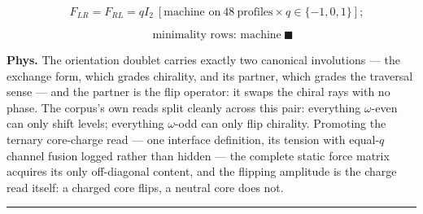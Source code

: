 \begin{theorem}
\[
\quad F_{LR}=F_{RL}=qI_2\ [\text{machine on}\ 48\ \text{profiles}\times q\in\{-1,0,1\}];
\]

\[
\qquad \text{minimality rows: machine}\ \blacksquare
\]

\textbf{Phys.} The orientation doublet carries exactly two canonical involutions — the exchange form, which grades chirality, and its partner, which grades the traversal sense — and the partner is the flip operator: it swaps the chiral rays with no phase. The corpus's own reads split cleanly across this pair: everything $\omega$-even can only shift levels; everything $\omega$-odd can only flip chirality. Promoting the ternary core-charge read — one interface definition, its tension with equal-$q$ channel fusion logged rather than hidden — the complete static force matrix acquires its only off-diagonal content, and the flipping amplitude is the charge read itself: a charged core flips, a neutral core does not.

\vspace{2pt}\noindent\rule{\textwidth}{0.4pt}\vspace{2pt}

\end{theorem}

